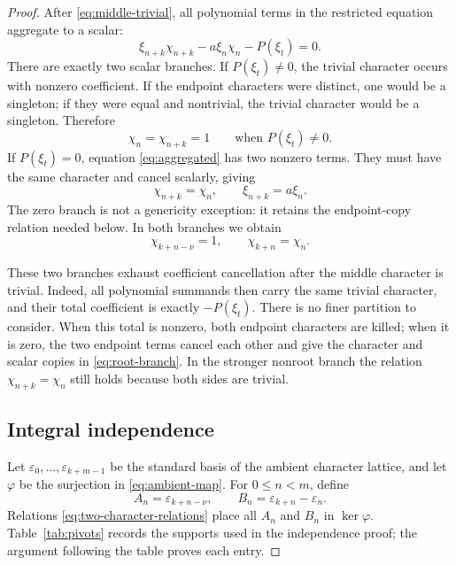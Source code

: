 \documentclass[11pt]{article}
\theoremstyle{definition}
\theoremstyle{remark}
\begin{document}
\begin{proof}
After \eqref{eq:middle-trivial}, all polynomial terms in the restricted equation aggregate to a scalar:
\begin{equation}
\xi_{n+k}\chi_{n+k}-a\xi_n\chi_n-P(\xi_t)=0.
\label{eq:aggregated}
\end{equation}
There are exactly two scalar branches.  If $P(\xi_t)\neq0$, the trivial character occurs with nonzero coefficient.  If the endpoint characters were distinct, one would be a singleton; if they were equal and nontrivial, the trivial character would be a singleton.  Therefore
\begin{equation}
\chi_n=\chi_{n+k}=1
\qquad\text{when }P(\xi_t)\neq0.
\label{eq:nonroot-branch}
\end{equation}
If $P(\xi_t)=0$, equation \eqref{eq:aggregated} has two nonzero terms.  They must have the same character and cancel scalarly, giving
\begin{equation}
\chi_{n+k}=\chi_n,
\qquad \xi_{n+k}=a\xi_n.
\label{eq:root-branch}
\end{equation}
The zero branch is not a genericity exception: it retains the endpoint-copy relation needed below.  In both branches we obtain
\begin{equation}
\chi_{k+n-\nu}=1,
\qquad \chi_{k+n}=\chi_n.
\label{eq:two-character-relations}
\end{equation}

These two branches exhaust coefficient cancellation after the middle
character is trivial.  Indeed, all polynomial summands then carry the same
trivial character, and their total coefficient is exactly
$-P(\xi_t)$.  There is no finer partition to consider.  When this total is
nonzero, both endpoint characters are killed; when it is zero, the two
endpoint terms cancel each other and give the character and scalar copies in
\eqref{eq:root-branch}.  In the stronger nonroot branch the relation
$\chi_{n+k}=\chi_n$ still holds because both sides are trivial.

\subsection{Integral independence}

Let $\varepsilon_0,\ldots,\varepsilon_{k+m-1}$ be the standard basis of the ambient character lattice, and let $\varphi$ be the surjection in \eqref{eq:ambient-map}.  For $0\leq n<m$, define
\begin{equation}
A_n=\varepsilon_{k+n-\nu},
\qquad B_n=\varepsilon_{k+n}-\varepsilon_n.
\label{eq:AnBn}
\end{equation}
Relations \eqref{eq:two-character-relations} place all $A_n$ and $B_n$ in $\ker\varphi$.  Table~\ref{tab:pivots} records the supports used in the independence proof; the argument following the table proves each entry.


\end{proof}
\end{document}
